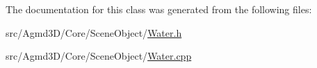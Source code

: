 The documentation for this class was generated from the following files\+:\begin{DoxyCompactItemize}
\item 
src/\+Agmd3\+D/\+Core/\+Scene\+Object/\hyperlink{_water_8h}{Water.\+h}\item 
src/\+Agmd3\+D/\+Core/\+Scene\+Object/\hyperlink{_water_8cpp}{Water.\+cpp}\end{DoxyCompactItemize}
